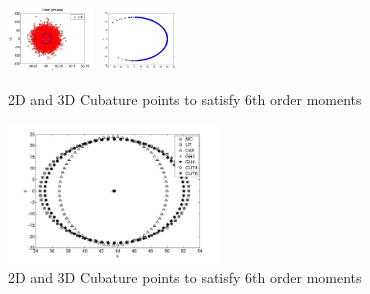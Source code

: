 \documentclass[letterpaper, 10 pt, conference]{ieeeconf}  %
\begin{document}
   \begin{figure}[thpb]
      \centering
      \includegraphics[width=0.2\textwidth]{polar}
      \includegraphics[width=0.2\textwidth]{polartocart2}
      \caption{2D and 3D Cubature points to satisfy 6th order moments}
      \label{fig:polartocart3}
   \end{figure} 
   
   \begin{figure}[thpb]
      \centering
      \includegraphics[width=0.5\textwidth]{polartocart}
      \caption{2D and 3D Cubature points to satisfy 6th order moments}
      \label{fig:polartocart4}
   \end{figure} 

\end{document}
